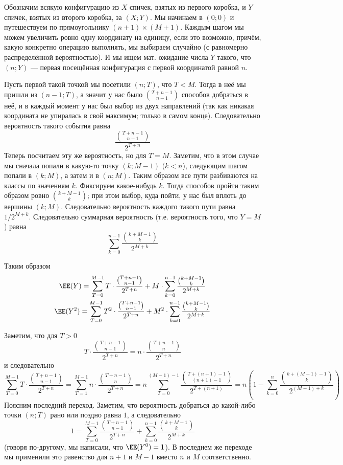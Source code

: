 \documentclass[12pt,a4paper]{article}
\begin{document}
    \begin{enumproblem}
        Обозначим всякую конфигурацию из $X$ спичек, взятых из первого коробка, и $Y$ спичек, взятых из второго коробка, за $(X; Y)$. Мы начинаем в $(0; 0)$ и путешествуем по прямоугольнику $(n+1) \times (M + 1)$. Каждым шагом мы можем увеличить ровно одну координату на единицу, если это возможно, причём, какую конкретно операцию выполнять, мы выбираем случайно (с равномерно распределённой вероятностью). И мы ищем мат. ожидание числа $Y$ такого, что $(n; Y)$ --- первая посещённая конфигурация с первой координатой равной $n$.

        Пусть первой такой точкой мы посетили $(n; T)$, что $T < M$. Тогда в неё мы пришли из $(n-1; T)$, а значит у нас было $\binom{T+n-1}{n-1}$ способов добраться в неё, и в каждый момент у нас был выбор из двух направлений (так как никакая координата не упиралась в свой максимум; только в самом конце). Следовательно вероятность такого события равна
        \[\frac{\binom{T+n-1}{n-1}}{2^{T+n}}\]
        Теперь посчитаем эту же вероятность, но для $T = M$. Заметим, что в этом случае мы сначала попали в какую-то точку $(k; M-1)$ ($k < n$), следующим шагом попали в $(k; M)$, а затем и в $(n; M)$. Таким образом все пути разбиваются на классы по значениям $k$. Фиксируем какое-нибудь $k$. Тогда способов пройти таким образом ровно $\binom{k+M-1}{k}$; при этом выбор, куда пойти, у нас был вплоть до вершины $(k; M)$. Следовательно вероятность каждого такого пути равна $1/2^{M+k}$. Следовательно суммарная вероятность (т.е. вероятность того, что $Y = M$) равна
        \[\sum_{k=0}^{n-1} \frac{\binom{k+M-1}{k}}{2^{M+k}}\]

        Таким образом
        \begin{gather*}
            \EE(Y) = \sum_{T=0}^{M-1} T \cdot \frac{\binom{T+n-1}{n-1}}{2^{T+n}} + M \cdot \sum_{k=0}^{n-1} \frac{\binom{k+M-1}{k}}{2^{M+k}}\\
            \EE(Y^2) = \sum_{T=0}^{M-1} T^2 \cdot \frac{\binom{T+n-1}{n-1}}{2^{T+n}} + M^2 \cdot \sum_{k=0}^{n-1} \frac{\binom{k+M-1}{k}}{2^{M+k}}
        \end{gather*}

        Заметим, что для $T > 0$
        \[T \cdot \frac{\binom{T+n-1}{n-1}}{2^{T+n}} = n \cdot \frac{\binom{T+n-1}{n}}{2^{T+n}}\]
        и следовательно
        \[
            \sum_{T=0}^{M-1} T \cdot \frac{\binom{T+n-1}{n-1}}{2^{T+n}}
            = \sum_{T=1}^{M-1} n \cdot \frac{\binom{T+n-1}{n}}{2^{T+n}}
            = n\sum_{T=0}^{(M-1)-1} \frac{\binom{T+(n+1)-1}{(n+1)-1}}{2^{T+(n+1)}}
            = n\left(1 - \sum_{k=0}^{n} \frac{\binom{k+(M-1)-1}{k}}{2^{(M-1)+k}}\right)
        \]
        Поясним последний переход. Заметим, что вероятность добраться до какой-либо точки $(n; T)$ рано или поздно равна $1$, а следовательно
        \[1 = \sum_{T=0}^{M-1} \frac{\binom{T+n-1}{n-1}}{2^{T+n}} + \sum_{k=0}^{n-1} \frac{\binom{k+M-1}{k}}{2^{M+k}}\]
        (говоря по-другому, мы написали, что $\EE(Y^0) = 1$). В последнем же переходе мы применили это равенство для $n+1$ и $M-1$ вместо $n$ и $M$ соответственно.


\end{enumproblem}
\end{document}
